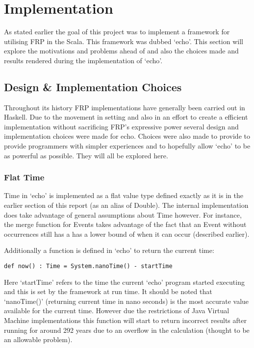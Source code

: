\chapter{Implementation}
  As stated earlier the goal of this project was to implement a framework for utilising FRP in the Scala. 
  This framework was dubbed `echo'. This section will explore the motivations and problems ahead of
  and also the choices made and results rendered during the implementation of `echo'.
  
  \section{Design \& Implementation Choices}
  Throughout its history FRP implementations have generally been carried out in Haskell. Due to the movement
  in setting and also in an effort to create a efficient implementation without sacrificing FRP's expressive power
  several design and implementation choices were made for echo. Choices were also made
  to provide to provide programmers with simpler experiences and to hopefully allow `echo' to be
  as powerful as possible. They will all be explored here.
  
    \subsection{Flat Time}
      Time in `echo' is implemented as a flat value type defined exactly as it is in the earlier
      section of this report (as an alias of Double). The internal implementation does take advantage
      of general assumptions about Time however. For instance, the merge function for Events takes advantage
      of the fact that an Event without occurrences still has a has a lower bound of when it can occur (described
      earlier). 
      
      Additionally a function is defined in `echo' to return the current time:
      
\begin{verbatim}
def now() : Time = System.nanoTime() - startTime
\end{verbatim}      

      Here `startTime' refers to the time the current `echo' program started executing and this is
      set by the framework at run time. It should be noted that `nanoTime()' (returning current time in
      nano seconds) is the most accurate value available for the current time. However due the restrictions
      of Java Virtual Machine implementations this function will start to return incorrect results 
      after running for around 292 years due to an overflow in the calculation (thought to be an allowable
      problem).
      
